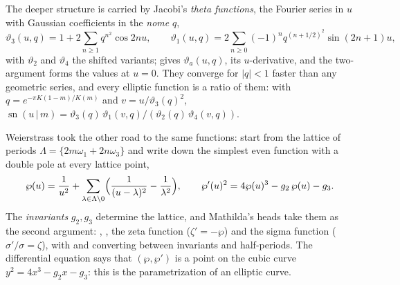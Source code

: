 The deeper structure is carried by Jacobi's \emph{theta functions}, the Fourier series
in \(u\) with Gaussian coefficients in the \emph{nome} \(q\),
\[
  \vartheta_3(u,q)=1+2\sum_{n\ge1}q^{n^2}\cos 2nu,\qquad
  \vartheta_1(u,q)=2\sum_{n\ge0}(-1)^nq^{(n+1/2)^2}\sin(2n+1)u,
\]
with \(\vartheta_2\) and \(\vartheta_4\) the shifted variants;
 gives \(\vartheta_a(u,q)\),
 its \(u\)-derivative, and the
two-argument forms the values at \(u=0\). They converge for \(|q|<1\) faster than any
geometric series, and every elliptic function is a ratio of them: with
\(q=e^{-\pi K(1-m)/K(m)}\) and \(v=u/\vartheta_3(q)^2\),
\(\operatorname{sn}(u\,|\,m)=\vartheta_3(q)\,\vartheta_1(v,q)/(\vartheta_2(q)\,
\vartheta_4(v,q))\).

\begin{codepairs}
\end{codepairs}

Weierstrass took the other road to the same functions: start from the lattice of
periods \(\Lambda=\{2m\omega_1+2n\omega_3\}\) and write down the simplest even function
with a double pole at every lattice point,
\[
  \wp(u)=\frac1{u^2}+\sum_{\lambda\in\Lambda\setminus0}
  \Bigl(\frac1{(u-\lambda)^2}-\frac1{\lambda^2}\Bigr),\qquad
  \wp'(u)^2=4\wp(u)^3-g_2\,\wp(u)-g_3 .
\]
The \emph{invariants} \(g_2,g_3\) determine the lattice, and Mathilda's heads take
them as the second argument: ,
, the zeta function
 (\(\zeta'=-\wp\)) and the sigma function
 (\(\sigma'/\sigma=\zeta\)), with
 and
 converting between
invariants and half-periods. The differential equation says that \((\wp,\wp')\) is a
point on the cubic curve \(y^2=4x^3-g_2x-g_3\): this is the parametrization of an
elliptic curve.

